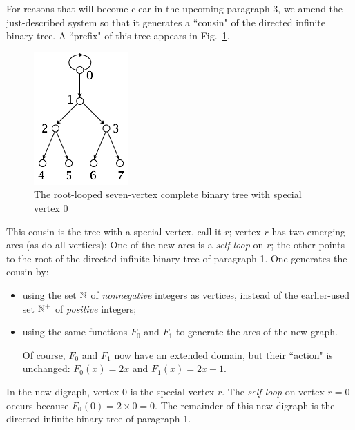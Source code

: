 For reasons that will become clear in the upcoming paragraph 3, we amend the just-described
system so that it generates a ``cousin" of the directed infinite binary tree.  A ``prefix" of this tree appears in Fig.~\ref{fig:TreeLabelling}.
\begin{figure}[hbt]
\begin{center}
       \includegraphics[scale=0.5]{FiguresGraph/TreeLabelling}
\caption{The root-looped seven-vertex complete binary tree with special vertex $0$}
\label{fig:TreeLabelling}
\end{center}
\end{figure}
This cousin is the tree with a special vertex, call it $r$; vertex $r$ has two emerging arcs (as do all vertices): One of the new arcs is a {\em self-loop} on $r$; the other points to the root of the directed infinite binary tree of paragraph 1.  One generates the cousin by:
\begin{itemize}
\item
using the set $\mathbb{N}$ of {\em nonnegative} integers as vertices, instead of the earlier-used set $\mathbb{N}^+$ of {\em positive} integers;
\medskip\item
using the same functions $F_0$ and $F_1$ to generate the arcs of the new graph.

\smallskip

Of course, $F_0$ and $F_1$ now have an extended domain, but their ``action" is unchanged: $F_0(x) = 2x$ and $F_1(x) = 2x+1$.
\end{itemize}
In the new digraph, vertex $0$ is the special vertex $r$.  The {\em self-loop} on vertex $r=0$ occurs because $F_0(0) = 2 \times 0 = 0$.  The remainder of this new digraph is the directed infinite binary tree of paragraph 1.

\bigskip

